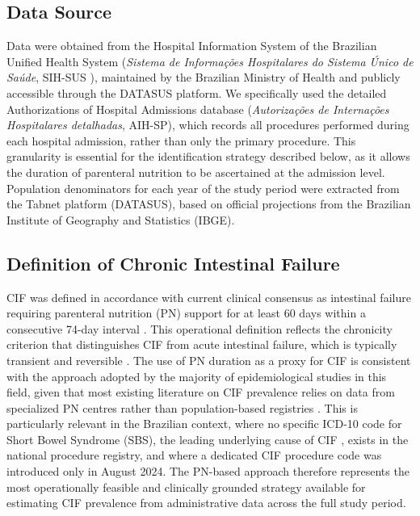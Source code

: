 \documentclass[pdflatex,sn-mathphys-num]{sn-jnl}
\theoremstyle{thmstyleone}%
\theoremstyle{thmstyletwo}%
\theoremstyle{thmstylethree}%
\begin{document}
\subsection*{Data Source}

Data were obtained from the Hospital Information System of the Brazilian Unified Health System (\textit{Sistema de Informa\c{c}\~oes Hospitalares do Sistema \'{U}nico de Sa\'{u}de}, SIH-SUS \citep{datasus_sihsus}), maintained by the Brazilian Ministry of Health and publicly accessible through the DATASUS platform. We specifically used the detailed Authorizations of Hospital Admissions database (\textit{Autoriza\c{c}\~oes de Interna\c{c}\~oes Hospitalares detalhadas}, AIH-SP), which records all procedures performed during each hospital admission, rather than only the primary procedure. This granularity is essential for the identification strategy described below, as it allows the duration of parenteral nutrition to be ascertained at the admission level. Population denominators for each year of the study period were extracted from the Tabnet platform (DATASUS), based on official projections from the Brazilian Institute of Geography and Statistics (IBGE).

\subsection*{Definition of Chronic Intestinal Failure}

CIF was defined in accordance with current clinical consensus as intestinal failure requiring parenteral nutrition (PN) support for at least 60 days within a consecutive 74-day interval \cite{aspen2022pif}. This operational definition reflects the chronicity criterion that distinguishes CIF from acute intestinal failure, which is typically transient and reversible \cite{goulet2006causes, pironi2023espen}. The use of PN duration as a proxy for CIF is consistent with the approach adopted by the majority of epidemiological studies in this field, given that most existing literature on CIF prevalence relies on data from specialized PN centres rather than population-based registries \cite{beath2011trends, antunes2020portuguese, mukhopadhyay2019}. This is particularly relevant in the Brazilian context, where no specific ICD-10 code for Short Bowel Syndrome (SBS), the leading underlying cause of CIF \cite{lezo2022chronic, pironi2023espen}, exists in the national procedure registry, and where a dedicated CIF procedure code was introduced only in August 2024. The PN-based approach therefore represents the most operationally feasible and clinically grounded strategy available for estimating CIF prevalence from administrative data across the full study period.
\end{document}
